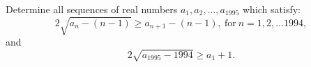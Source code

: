 Determine all sequences of real numbers $a_1,a_2,\ldots,a_{1995}$ which satisfy: \[ 2\sqrt{a_n - (n - 1)} \geq a_{n+1} - (n - 1), \ \text{for} \ n = 1, 2, \ldots 1994,  \] and \[ 2\sqrt{a_{1995} - 1994} \geq a_1 + 1.  \]
